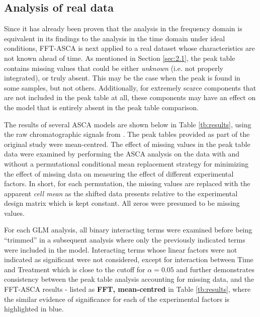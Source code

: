\documentclass[preprint,12pt]{elsarticle}
\begin{document}
\subsection{Analysis of real data}

Since it has already been proven that the analysis in the frequency domain is equivalent in its findings to the analysis in the time domain under ideal conditions, FFT-ASCA is next applied to a real dataset whose characteristics are not known ahead of time. As mentioned in Section \ref{sec:2.1}, the peak table contains missing values that could be either \textit{unknown} (i.e. not properly integrated), or truly absent. This may be the case when the peak is found in some samples, but not others. Additionally, for extremely scarce components that are not included in the peak table at all, these components may have an effect on the model that is entirely absent in the peak table comparison.  

The results of several ASCA models are shown below in Table \ref{tb:results}, using the raw chromatographic signals from \cite{lo2023immune}.  The peak tables provided as part of the original study were mean-centred. The effect of missing values in the peak table data were examined by performing the ASCA analysis on the data with and without a permutational conditional mean replacement strategy for minimizing the effect of missing data on measuring the effect of different experimental factors. In short, for each permutation, the missing values are replaced with the apparent \textit{cell mean} as the shifted data presents relative to the experimental design matrix which is kept constant. All zeros were presumed to be missing values.

For each GLM analysis, all binary interacting terms were examined before being ``trimmed'' in a subsequent analysis where only the previously indicated terms were included in the model. Interacting terms whose linear factors were not indicated as significant were not considered, except for interaction between Time and Treatment which is close to the cutoff for $\alpha = 0.05$ and further demonstrates consistency between the peak table analysis accounting for missing data, and the FFT-ASCA results - listed as \textbf{FFT, mean-centred} in Table \ref{tb:results}, where the similar evidence of significance for each of the experimental factors is highlighted in blue. 
\end{document}
